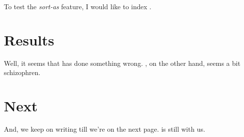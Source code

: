 \documentclass[11pt,norsk,english,american,a4paper]{article}
\begin{document}
To test the \emph{sort-as} feature, I would like to index .



\section{Results}
\label{sec:results}
Well, it seems that  has done something wrong.  , on
the other hand, seems a bit schizophren.


\section{Next}
\label{sec:next}

And, we keep on writing till we're on the next page.   is
still with us.



\printindex[raw]

\end{document}

